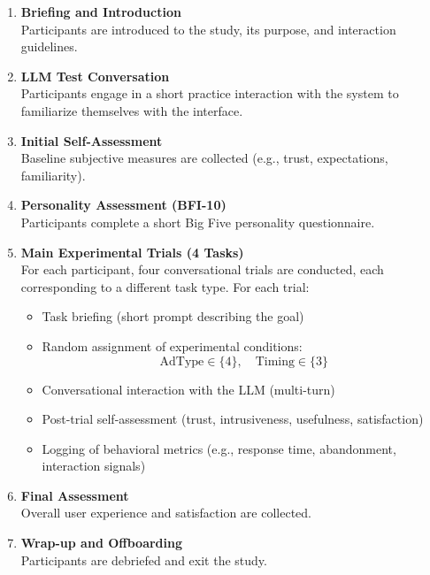 \documentclass{article}
\begin{document}
\begin{enumerate}
    \item \textbf{Briefing and Introduction} \\
    Participants are introduced to the study, its purpose, and interaction guidelines.

    \item \textbf{LLM Test Conversation} \\
    Participants engage in a short practice interaction with the system to familiarize themselves with the interface.

    \item \textbf{Initial Self-Assessment} \\
    Baseline subjective measures are collected (e.g., trust, expectations, familiarity).

    \item \textbf{Personality Assessment (BFI-10)} \\
    Participants complete a short Big Five personality questionnaire.

    \item \textbf{Main Experimental Trials (4 Tasks)} \\
    For each participant, four conversational trials are conducted, each corresponding to a different task type. For each trial:
    \begin{itemize}
        \item Task briefing (short prompt describing the goal)
        \item Random assignment of experimental conditions:
        \[
        \text{AdType} \in \{4\}, \quad \text{Timing} \in \{3\}
        \]
        \item Conversational interaction with the LLM (multi-turn)
        \item Post-trial self-assessment (trust, intrusiveness, usefulness, satisfaction)
        \item Logging of behavioral metrics (e.g., response time, abandonment, interaction signals)
    \end{itemize}

    \item \textbf{Final Assessment} \\
    Overall user experience and satisfaction are collected.

    \item \textbf{Wrap-up and Offboarding} \\
    Participants are debriefed and exit the study.
\end{enumerate}
\end{document}
